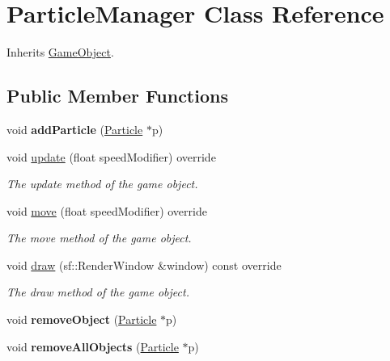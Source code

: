 \hypertarget{class_particle_manager}{\section{Particle\+Manager Class Reference}
\label{class_particle_manager}
}


Inherits \hyperlink{class_game_object}{Game\+Object}.

\subsection*{Public Member Functions}
\begin{DoxyCompactItemize}
\item 
\hypertarget{class_particle_manager_a651901462992745401596956c790d87d}{void {\bfseries add\+Particle} (\hyperlink{class_particle}{Particle} $\ast$p)}\label{class_particle_manager_a651901462992745401596956c790d87d}

\item 
void \hyperlink{class_particle_manager_a2c786926fc1cd9992c518b3ea4ee07cb}{update} (float speed\+Modifier) override
\begin{DoxyCompactList}\small\item\em The update method of the game object. \end{DoxyCompactList}\item 
void \hyperlink{class_particle_manager_a77357f72908d4fa5eea451baee1b354d}{move} (float speed\+Modifier) override
\begin{DoxyCompactList}\small\item\em The move method of the game object. \end{DoxyCompactList}\item 
void \hyperlink{class_particle_manager_a03682007d1bedb0f00795026f14a517c}{draw} (sf\+::\+Render\+Window \&window) const override
\begin{DoxyCompactList}\small\item\em The draw method of the game object. \end{DoxyCompactList}\item 
\hypertarget{class_particle_manager_a1973cc7d0869d695ce1b516dce7584f4}{void {\bfseries remove\+Object} (\hyperlink{class_particle}{Particle} $\ast$p)}\label{class_particle_manager_a1973cc7d0869d695ce1b516dce7584f4}

\item 
\hypertarget{class_particle_manager_a41c792442b70b1f027d9b782fdb73060}{void {\bfseries remove\+All\+Objects} (\hyperlink{class_particle}{Particle} $\ast$p)}\label{class_particle_manager_a41c792442b70b1f027d9b782fdb73060}

\end{DoxyCompactItemize}
